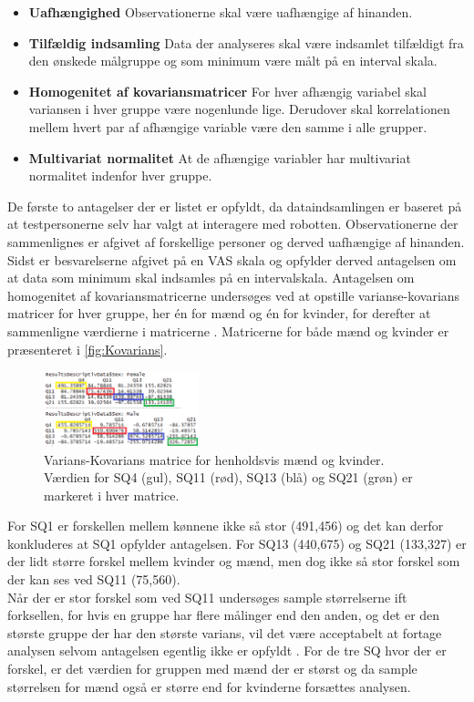 \begin{itemize}
	\item \textbf{Uafhængighed} Observationerne skal være uafhængige af hinanden. 
	\item \textbf{Tilfældig indsamling} Data der analyseres skal være indsamlet tilfældigt fra den ønskede målgruppe og som minimum være målt på en interval skala. 
	\item \textbf{Homogenitet af kovariansmatricer} For hver afhængig variabel skal variansen i hver gruppe være nogenlunde lige. Derudover skal korrelationen mellem hvert par af afhængige variable være den samme i alle grupper. 
	\item \textbf{Multivariat normalitet} At de afhængige variabler har multivariat normalitet indenfor hver gruppe. 
\end{itemize}
%
De første to antagelser der er listet er opfyldt, da dataindsamlingen er baseret på at testpersonerne selv har valgt at interagere med robotten. Observationerne der sammenlignes er afgivet af forskellige personer og derved uafhængige af hinanden. Sidst er besvarelserne afgivet på en VAS skala og opfylder derved antagelsen om at data som minimum skal indsamles på en intervalskala. \blankline
% 
Antagelsen om homogenitet af kovariansmatricerne undersøges ved at opstille varianse-kovarians matricer for hver gruppe, her én for mænd og én for kvinder, for derefter at sammenligne værdierne i matricerne \parencite[s. 725]{FieldMANOVA}. Matricerne for både mænd og kvinder er præsenteret i \autoref{fig:Kovarians}.
%
\begin{figure}[H]
\centering
\includegraphics[width = 0.4\textwidth]{Figure/DatabehandlingSkalaer/Normality} 
\caption{Varians-Kovarians matrice for henholdsvis mænd og kvinder. Værdien for SQ4 (gul), SQ11 (rød), SQ13 (blå) og SQ21 (grøn) er markeret i hver matrice.}
\label{fig:Kovarians}
\end{figure}
\noindent
%
For SQ1 er forskellen mellem kønnene ikke så stor (491,456) og det kan derfor konkluderes at SQ1 opfylder antagelsen. For SQ13 (440,675) og SQ21 (133,327) er der lidt større forskel mellem kvinder og mænd, men dog ikke så stor forskel som der kan ses ved SQ11 (75,560). \\
Når der er stor forskel som ved SQ11 undersøges sample størrelserne ift forksellen, for hvis en gruppe har flere målinger end den anden, og det er den største gruppe der har den største varians, vil det være acceptabelt at fortage analysen selvom antagelsen egentlig ikke er opfyldt \parencite[s. 725]{FieldMANOVA}. For de tre SQ hvor der er forskel, er det værdien for gruppen med mænd der er størst og da sample størrelsen for mænd også er større end for kvinderne forsættes analysen. \blankline

